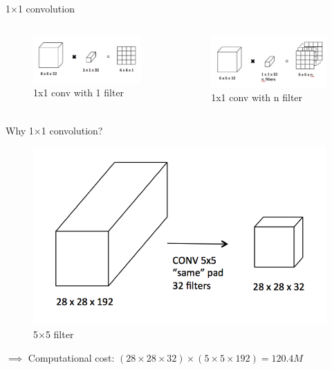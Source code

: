 \documentclass[aspectratio=169]{beamer}
\begin{document}
\begin{frame}{1$\times$1 convolution}
  \begin{columns}[T,c,onlytextwidth]
\begin{figure}
\includegraphics[scale=0.25]{demo/figs/1x1.png}
\caption{1x1 conv with 1 filter}
\label{fig:1x1}
\end{figure}
\begin{figure}
\includegraphics[scale=0.25]{demo/figs/1x1conv.png}
\caption{1x1 conv with n filter}
\label{fig:1x1conv}
\end{figure}

\end{columns}
\end{frame}

\begin{frame}{Why 1$\times$1 convolution?}
\begin{figure}
    \centering
    \includegraphics[scale=0.3]{demo/figs/cost1.png}
    \caption{5$\times$5 filter }
    \label{fig:cost1}
\end{figure}
$\implies$ Computational cost: $(28 \times 28 \times 32) \times (5 \times 5 \times 192) = 120.4M$
\end{frame}
\end{document}
